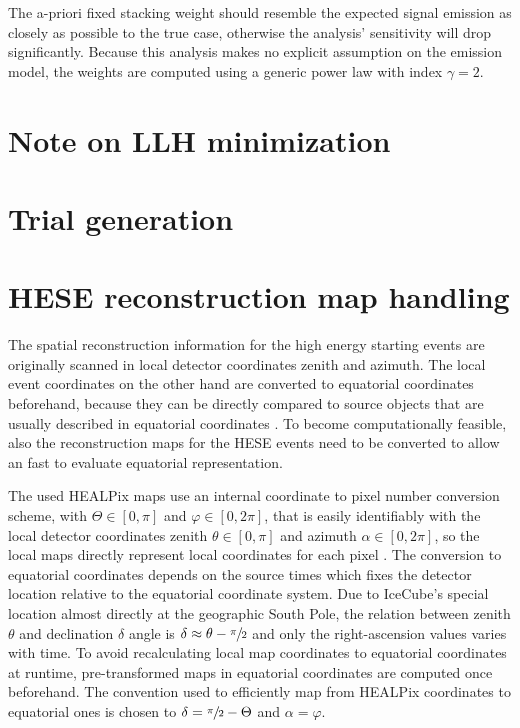 The a-priori fixed stacking weight should resemble the expected signal emission as closely as possible to the true case, otherwise the analysis' sensitivity will drop significantly.
Because this analysis makes no explicit assumption on the emission model, the weights are computed using a generic power law with index $\gamma=2$.


\section{Note on LLH minimization}

\section{Trial generation}

\section{HESE reconstruction map handling}
The spatial reconstruction information for the high energy starting events are originally scanned in local detector coordinates zenith and azimuth.
The local event coordinates on the other hand are converted to equatorial coordinates beforehand, because they can be directly compared to source objects that are  usually described in equatorial coordinates .
To become computationally feasible, also the reconstruction maps for the HESE events need to be converted to allow an fast to evaluate equatorial representation.

The used HEALPix maps use an internal coordinate to pixel number conversion scheme, with $\Theta\in[0, \pi]$ and $\varphi\in[0, 2\pi]$, that is easily identifiably with the local detector coordinates zenith $\theta\in[0, \pi]$ and azimuth $\alpha\in[0, 2\pi]$, so the local maps directly represent local coordinates for each pixel .
The conversion to equatorial coordinates depends on the source times which fixes the detector location relative to the equatorial coordinate system.
Due to IceCube's special location almost directly at the geographic South Pole, the relation between zenith $\theta$ and declination $\delta$ angle is $\delta \approx \theta - \sfrac{\pi}{2}$ and only the right-ascension values varies with time.
To avoid recalculating local map coordinates to equatorial coordinates at runtime, pre-transformed maps in equatorial coordinates are computed once beforehand.
The convention used to efficiently map from HEALPix coordinates to equatorial ones is chosen to $\delta = \sfrac{\pi}{2} - \Theta$ and $\alpha = \varphi$.

